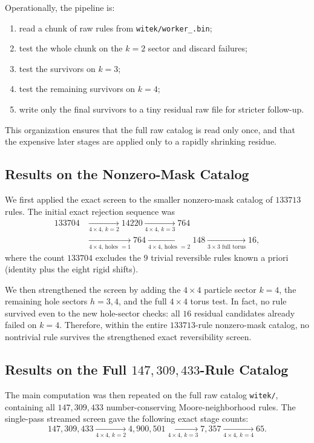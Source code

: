 \documentclass[11pt,a4paper]{article}
\begin{document}
Operationally, the pipeline is:
\begin{enumerate}
\item read a chunk of raw rules from \texttt{witek/worker\_\*.bin};
\item test the whole chunk on the \(k=2\) sector and discard failures;
\item test the survivors on \(k=3\);
\item test the remaining survivors on \(k=4\);
\item write only the final survivors to a tiny residual raw file for stricter follow-up.
\end{enumerate}

This organization ensures that the full raw catalog is read only once, and that the expensive
later stages are applied only to a rapidly shrinking residue.

\subsection{Results on the Nonzero-Mask Catalog}

We first applied the exact screen to the smaller nonzero-mask catalog of \(133713\) rules.  The
initial exact rejection sequence was
\begin{align*}
133704
&\xrightarrow[\text{\(4\times4\), \(k=2\)}]{} 14220
\xrightarrow[\text{\(4\times4\), \(k=3\)}]{} 764 \\
&\xrightarrow[\text{\(4\times4\), holes \(=1\)}]{} 764
\xrightarrow[\text{\(4\times4\), holes \(=2\)}]{} 148
\xrightarrow[\text{\(3\times3\) full torus}]{} 16,
\end{align*}
where the count \(133704\) excludes the \(9\) trivial reversible rules known a priori
(identity plus the eight rigid shifts).

We then strengthened the screen by adding the \(4\times4\) particle sector \(k=4\), the
remaining hole sectors \(h=3,4\), and the full \(4\times4\) torus test.  In fact, no rule
survived even to the new hole-sector checks: all \(16\) residual candidates already failed on
\(k=4\).  Therefore, within the entire \(133713\)-rule nonzero-mask catalog, no nontrivial rule
survives the strengthened exact reversibility screen.

\subsection{Results on the Full \(147{,}309{,}433\)-Rule Catalog}

The main computation was then repeated on the full raw catalog \texttt{witek/}, containing all
\(147{,}309{,}433\) number-conserving Moore-neighborhood rules.  The single-pass streamed screen
gave the following exact stage counts:
\[
147{,}309{,}433
\xrightarrow[\text{\(4\times4\), \(k=2\)}]{} 4{,}900{,}501
\xrightarrow[\text{\(4\times4\), \(k=3\)}]{} 7{,}357
\xrightarrow[\text{\(4\times4\), \(k=4\)}]{} 65.
\]
\end{document}
